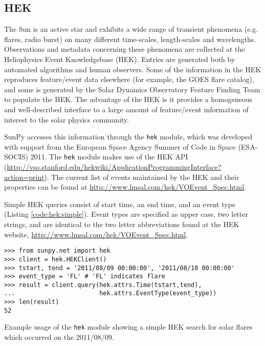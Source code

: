 \subsection{HEK}\label{ssec:hek}

The Sun is an active star and exhibits a wide range of transient phenomena (e.g. flares, 
radio burst) on many 
different time-scales, length-scales and wavelengths. Observations and metadata 
concerning these phenomena are collected at the Heliophysics Event 
Knowledgebase (HEK).  Entries are generated both by automated algorithms and 
human observers.  Some of the information in the HEK reproduces feature/event 
data elsewhere (for example, the GOES flare catalog), and some is generated by 
the Solar Dynamics Observatory Feature Finding Team \cite{SDOFFT paper???} to
populate the HEK.  The advantage of the HEK is it provides a homogeneous and 
well-described interface to a large 
amount of feature/event information of interest to the solar physics community.

SunPy accesses this information through the \texttt{hek} module, which was 
developed with support from the European Space Agency Summer of Code in 
Space (ESA-SOCIS) 2011.  The \texttt{hek} module makes use of the HEK API
(\url{http://vso.stanford.edu/hekwiki/ApplicationProgrammingInterface?action=print}).
The current list of 
events maintained by the HEK and their properties can be found at 
\url{http://www.lmsal.com/hek/VOEvent_Spec.html}.

Simple HEK queries consist of start time, an end time, and an event type 
(Listing \ref{code:hek:simple}). Event types are specified as upper case, 
two letter strings, and are 
identical to the two letter abbreviations found at the HEK website, 
\url{http://www.lmsal.com/hek/VOEvent_Spec.html}.

\begin{listing}[H]
\begin{verbatim}
>>> from sunpy.net import hek
>>> client = hek.HEKClient()
>>> tstart, tend = '2011/08/09 00:00:00', '2011/08/10 00:00:00'
>>> event_type = 'FL' # 'FL' indicates flare
>>> result = client.query(hek.attrs.Time(tstart,tend), 
...                       hek.attrs.EventType(event_type))
>>> len(result)
52
\end{verbatim}
\caption{Example usage of the \texttt{hek} module showing a simple HEK search for solar flares
which occurred on the 2011/08/09.}
\label{code:hek:simple}
\end{listing}

